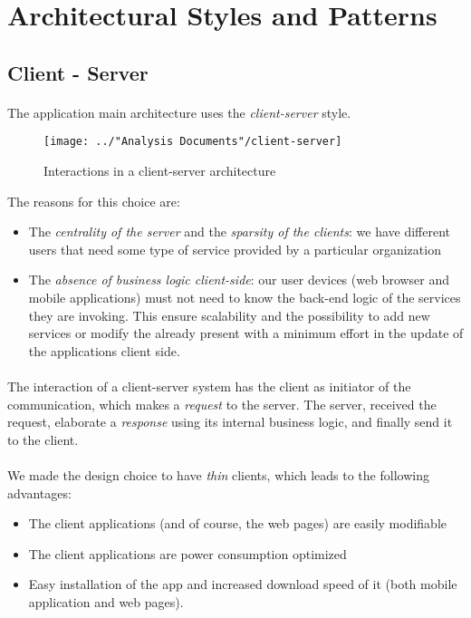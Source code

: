 \section{Architectural Styles and Patterns}

\subsection{Client - Server}
\paragraph{}The application main architecture uses the \textit{client-server} style.
\begin{figure}[H]
	\centering
	\texttt{[image: ../"Analysis Documents"/client-server]}
	\caption{Interactions in a client-server architecture}
\end{figure}
The reasons for this choice are:
\begin{itemize}
	\item The \textit{centrality of the server} and the \textit{sparsity of the clients}: we have different users that need some type of service provided by a particular organization
	\item The \textit{absence of business logic client-side}: our user devices (web browser and mobile applications) must not need to know the back-end logic of the services they are invoking. This ensure scalability and the possibility to add new services or modify the already present with a minimum effort in the update of the applications client side.
\end{itemize}
\paragraph{}The interaction of a client-server system has the client as initiator of the communication, which makes a \textit{request} to the server. The server, received the request, elaborate a \textit{response} using its internal business logic, and finally send it to the client.
\paragraph{}We made the design choice to have \textit{thin} clients, which leads to the following advantages:
\begin{itemize}
	\item The client applications (and of course, the web pages) are easily modifiable
	\item The client applications are power consumption optimized
	\item Easy installation of the app and increased download speed of it (both mobile application and web pages).
\end{itemize}
